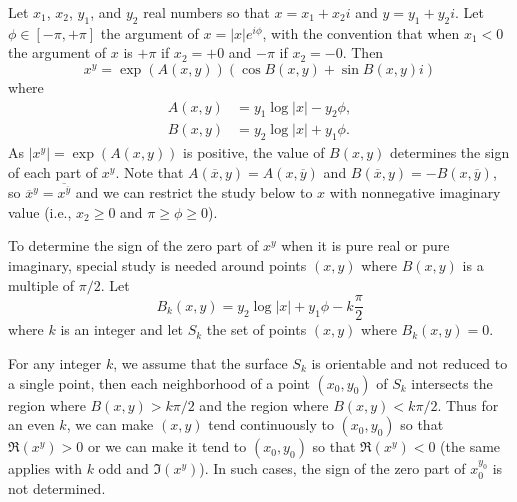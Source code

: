 \documentclass [11pt]{article}
\renewcommand {\geq}{\geqslant}
\begin{document}
Let $x_1$, $x_2$, $y_1$, and $y_2$ real numbers so that $x = x_1 + x_2 i$ and
$y = y_1 + y_2 i$.
Let $\phi \in [-\pi, +\pi]$ the argument of $x = |x| e^{i\phi}$, with the
convention that when $x_1 < 0$ the argument of $x$ is $+\pi$ if $x_2 = +0$ and
$-\pi$ if $x_2 = -0$.
Then
\[
x^y=\exp\left(A(x,y)\right) \left(\cos B(x,y)+\sin B(x,y) i\right)
\] where
\begin {align*}
  A(x,y) & =  y_1\log|x|-y_2\phi,\\
  B(x,y) & =  y_2\log|x|+y_1\phi.
\end {align*}
As $|x^y| = \exp\left(A(x,y)\right)$ is positive, the value of $B(x,y)$
determines the sign of each part of $x^y$.
Note that $A(\overline{x},y) = A(x,\overline{y})$ and $B(\overline{x},
y)=-B(x,\overline{y})$, so $\overline{x}^y = \overline{x^{\overline{y}}}$ and
we can restrict the study below to $x$ with nonnegative imaginary value
(i.e., $x_2 \geq 0$ and $\pi \geq \phi \geq 0$).

To determine the sign of the zero part of $x^y$ when it is pure real or pure
imaginary, special study is needed around points $(x, y)$ where $B(x, y)$ is a
multiple of $\pi/2$.
Let
\begin {equation}
  \label {eqn:Bk}
  B_k(x, y) = y_2 \log|x| +y_1\phi -k\frac{\pi}{2}
\end {equation}
where $k$ is an integer and let $S_k$ the set of points $(x, y)$ where $B_k(x,
y) = 0$.

For any integer $k$, we assume that the surface $S_k$ is orientable and not
reduced to a single point, then each neighborhood of a point $(x_0, y_0)$ of
$S_k$ intersects the region where $B(x, y) > k\pi/2$ and the region where $B(x,
y) < k\pi/2$.
Thus for an even $k$, we can make $(x, y)$ tend continuously to $(x_0, y_0)$
so that $\Re(x^y) > 0$ or we can make it tend to $(x_0, y_0)$ so that
$\Re(x^y) < 0$ (the same applies with $k$ odd and $\Im(x^y)$).
In such cases, the sign of the zero part of $x_0^{y_0}$ is not determined.
\end{document}
